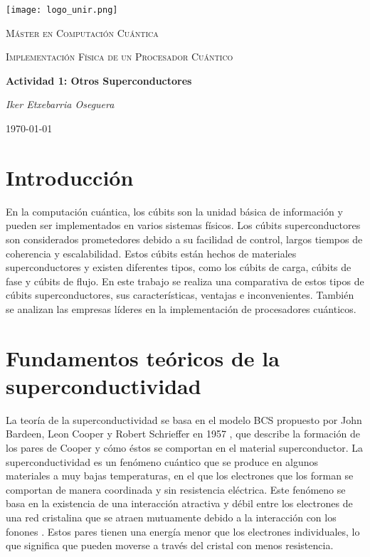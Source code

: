\documentclass[11pt]{article}
\begin{document}
\begin{titlepage}
    \centering
    \texttt{[image: logo\_unir.png]}\par\vspace{1cm}
    \vspace{1cm}
    {\scshape\Large Máster en Computación Cuántica\par}    
    \vspace{1cm}
    {\scshape\Large Implementación Física de un Procesador Cuántico\par}
    \vspace{3cm}
    {\Huge\bfseries Actividad 1: Otros Superconductores\par}
    \vspace{1.5cm}
    {\Large\itshape Iker Etxebarria Oseguera\par}
    \vfill
    {\large \today\par}
\end{titlepage}

\newpage

\section{Introducción}

En la computación cuántica, los cúbits son la unidad básica de información y pueden ser implementados en varios sistemas físicos. Los cúbits superconductores son considerados prometedores debido a su facilidad de control, largos tiempos de coherencia y escalabilidad. Estos cúbits están hechos de materiales superconductores y existen diferentes tipos, como los cúbits de carga, cúbits de fase y cúbits de flujo. En este trabajo se realiza una comparativa de estos tipos de cúbits superconductores, sus características, ventajas e inconvenientes. También se analizan las empresas líderes en la implementación de procesadores cuánticos.

\section{Fundamentos teóricos de la superconductividad}

La teoría de la superconductividad se basa en el modelo BCS propuesto por John Bardeen, Leon Cooper y Robert Schrieffer en 1957 \citep{bardeen_theory_1957}, que describe la formación de los pares de Cooper y cómo éstos se comportan en el material superconductor. La superconductividad es un fenómeno cuántico que se produce en algunos materiales a muy bajas temperaturas, en el que los electrones que los forman se comportan de manera coordinada y sin resistencia eléctrica. Este fenómeno se basa en la existencia de una interacción atractiva y débil \citep{bardeen_theory_1957} entre los electrones de una red cristalina que se atraen mutuamente debido a la interacción con los fonones \citep{ferrell_knight_1959}. Estos pares tienen una energía menor que los electrones individuales, lo que significa que pueden moverse a través del cristal con menos resistencia.
\end{document}
